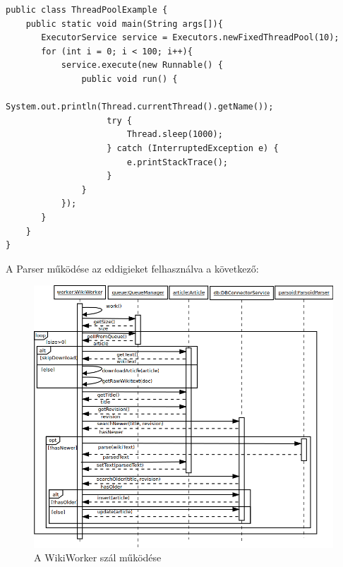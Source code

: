 \begin{lstlisting}[label={lst:threadpool}, caption=ThreadPool használata,breaklines=true]
public class ThreadPoolExample {
    public static void main(String args[]){
       ExecutorService service = Executors.newFixedThreadPool(10);
       for (int i = 0; i < 100; i++){
           service.execute(new Runnable() {
        	   public void run() {
        		    System.out.println(Thread.currentThread().getName());
        			try {
						Thread.sleep(1000);
					} catch (InterruptedException e) {
						e.printStackTrace();
					}
        	   }   
           });
       }
    }
}
\end{lstlisting}

A Parser működése az eddigieket felhasználva a következő:

\begin{figure}[htp]
\centering
\includegraphics[scale=0.5]{img/sequence_parser2}
\caption{A WikiWorker szál működése}
\label{fig:sequence_parser2}
\end{figure}

